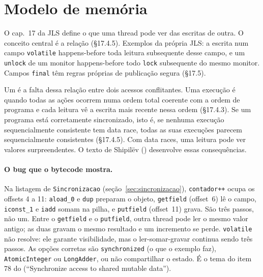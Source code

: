 \section{Modelo de memória}
\label{sec:modelo-memoria}

O cap.~17 da JLS define o que uma thread pode ver das escritas de
outra. O conceito central é a relação
 (§17.4.5). Exemplos da própria JLS: a escrita num campo
\texttt{volatile} happens-before toda leitura subsequente desse campo, e
um \texttt{unlock} de um monitor happens-before todo \texttt{lock}
subsequente do mesmo monitor. Campos \texttt{final} têm regras próprias
de publicação segura (§17.5).

Um  é a falta dessa
relação entre dois acessos conflitantes. Uma execução é
 quando todas as ações
ocorrem numa ordem total coerente com a ordem de programa e cada
leitura vê a escrita mais recente nessa ordem (§17.4.3). Se
um programa está corretamente sincronizado, isto é, se nenhuma execução
sequencialmente consistente tem data race, todas as suas execuções
parecem sequencialmente consistentes (§17.4.5).
Com data races, uma leitura pode ver valores surpreendentes. O texto de Shipilëv
() desenvolve essas consequências.

\paragraph{O bug que o bytecode mostra.}
Na listagem de \texttt{Sincronizacao} (seção~\ref{sec:sincronizacao}),
\texttt{contador++} ocupa os offsets 4 a 11: \texttt{aload\_0} e
\texttt{dup} preparam o objeto, \texttt{getfield} (offset~6) lê o
campo, \texttt{iconst\_1} e \texttt{iadd} somam na pilha, e
\texttt{putfield} (offset~11) grava. São três passos, não um.
Entre o \texttt{getfield} e o \texttt{putfield}, outra thread pode ler o
mesmo valor antigo; as duas gravam o mesmo resultado e um incremento se
perde. \texttt{volatile} não resolve: ele garante visibilidade, mas o
ler-somar-gravar continua sendo três passos. As opções corretas são
\texttt{synchronized} (o que o exemplo faz), \texttt{AtomicInteger} ou
\texttt{LongAdder}, ou não compartilhar o estado. É o tema do item 78
do  (\enquote{Synchronize access to shared
mutable data}).

